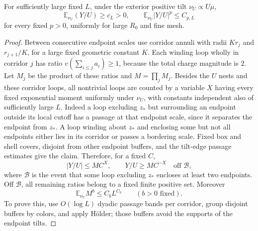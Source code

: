 \begin{lemma}
\label{wall:distant}
For sufficiently large fixed $L$, under the exterior positive tilt
$\nu_U\propto U\mu$,
\begin{equation}
 \mathbb E_{\nu_U}(Y/U)\ge c_L>0,\qquad
 \mathbb E_{\nu_U}|Y/U|^p\le C_{p,L}
 \label{wall:distant-moments}
\end{equation}
for every fixed $p>0$, uniformly for large $R_0$ and fine mesh.
\end{lemma}

\begin{proof}
Between consecutive endpoint scales use corridor annuli with radii
$Kr_j$ and $r_{j+1}/K$, for a large fixed geometric constant $K$.
Each winding loop wholly in corridor $j$ has ratio
$v(\sum_{i\le j}a_i)\ge1$, because the total charge magnitude is $2$.
Let $M_j$ be the product of these ratios and $M=\prod_jM_j$.
Besides the $U$ nests and these corridor loops, all nontrivial loops
are counted by a variable $X$ having every fixed exponential moment
uniformly under $\nu_U$, with constants independent also of sufficiently
large $L$.  Indeed a loop excluding $z_*$ but surrounding an endpoint
outside its local cutoff has a passage at that endpoint scale, since it
separates the endpoint from $z_*$.  A loop winding about $z_*$ and
enclosing some but not all endpoints either lies in its corridor or
passes a bordering scale.  Fixed box and shell covers, disjoint from
other endpoint buffers, and the tilt-edge passage estimates give the
claim.  Therefore, for a fixed $C$,
\begin{equation}
 |Y/U|\le MC^X,\qquad
 Y/U\ge MC^{-X}\quad\text{off }\mathcal B,
 \label{wall:MY}
\end{equation}
where $\mathcal B$ is the event that some loop excluding $z_*$ encloses
at least two endpoints.  Off $\mathcal B$, all remaining ratios belong
to a fixed finite positive set.  Moreover
\begin{equation}
 \mathbb E_{\nu_U}M^b\le C_bL^{C_b}\qquad(b>0\text{ fixed}).
 \label{wall:M-moments}
\end{equation}
To prove this, use $O(\log L)$ dyadic passage bands per corridor,
group disjoint buffers by colors, and apply H\"older; those buffers
avoid the supports of the endpoint tilts.


\end{proof}
